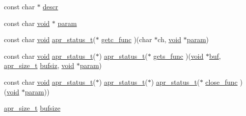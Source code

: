 \begin{DoxyCompactItemize}
\item 
const char $\ast$ \hyperlink{group__APACHE__CORE__CONFIG_gabf794d6208a15a1b5b0d4d15ca3cbdd3}{descr}
\item 
const char \hyperlink{group__MOD__ISAPI_gacd6cdbf73df3d9eed42fa493d9b621a6}{void} $\ast$ \hyperlink{group__APACHE__CORE__CONFIG_ga3d7b074bfac2baa107db985c8be71b74}{param}
\item 
const char \hyperlink{group__MOD__ISAPI_gacd6cdbf73df3d9eed42fa493d9b621a6}{void} \hyperlink{group__apr__errno_gaa5105fa83cc322f09382292db8b47593}{apr\+\_\+status\+\_\+t}($\ast$ \hyperlink{group__APACHE__CORE__CONFIG_ga91b9b6fa16765d274a6c00b1a9de522b}{getc\+\_\+func} )(char $\ast$ch, \hyperlink{group__MOD__ISAPI_gacd6cdbf73df3d9eed42fa493d9b621a6}{void} $\ast$\hyperlink{mod__mime_8c_a5c0eef538232854ead9eb8af12c04938}{param})
\item 
const char \hyperlink{group__MOD__ISAPI_gacd6cdbf73df3d9eed42fa493d9b621a6}{void} \hyperlink{group__apr__errno_gaa5105fa83cc322f09382292db8b47593}{apr\+\_\+status\+\_\+t}($\ast$) \hyperlink{group__apr__errno_gaa5105fa83cc322f09382292db8b47593}{apr\+\_\+status\+\_\+t}($\ast$ \hyperlink{group__APACHE__CORE__CONFIG_ga69dfd598eb3b30252867672fb5c422c8}{gets\+\_\+func} )(\hyperlink{group__MOD__ISAPI_gacd6cdbf73df3d9eed42fa493d9b621a6}{void} $\ast$\hyperlink{group__APR__Util__Bucket__Brigades_gae92da6cbed6002407731bd51f7c6b984}{buf}, \hyperlink{group__apr__platform_gaaa72b2253f6f3032cefea5712a27540e}{apr\+\_\+size\+\_\+t} \hyperlink{group__APACHE__CORE__PROTO_gab5121d4d91ca81860ed7c296210087f0}{bufsiz}, \hyperlink{group__MOD__ISAPI_gacd6cdbf73df3d9eed42fa493d9b621a6}{void} $\ast$\hyperlink{mod__mime_8c_a5c0eef538232854ead9eb8af12c04938}{param})
\item 
const char \hyperlink{group__MOD__ISAPI_gacd6cdbf73df3d9eed42fa493d9b621a6}{void} \hyperlink{group__apr__errno_gaa5105fa83cc322f09382292db8b47593}{apr\+\_\+status\+\_\+t}($\ast$) \hyperlink{group__apr__errno_gaa5105fa83cc322f09382292db8b47593}{apr\+\_\+status\+\_\+t}($\ast$) \hyperlink{group__apr__errno_gaa5105fa83cc322f09382292db8b47593}{apr\+\_\+status\+\_\+t}($\ast$ \hyperlink{group__APACHE__CORE__CONFIG_ga36deff347cb59bd8dabf131dcb9e437b}{close\+\_\+func} )(\hyperlink{group__MOD__ISAPI_gacd6cdbf73df3d9eed42fa493d9b621a6}{void} $\ast$\hyperlink{mod__mime_8c_a5c0eef538232854ead9eb8af12c04938}{param}))
\item 
\hyperlink{group__apr__platform_gaaa72b2253f6f3032cefea5712a27540e}{apr\+\_\+size\+\_\+t} \hyperlink{group__APACHE__CORE__CONFIG_ga251f5b82593ed6f6b369185c5b220f82}{bufsize}

\end{DoxyCompactItemize}
